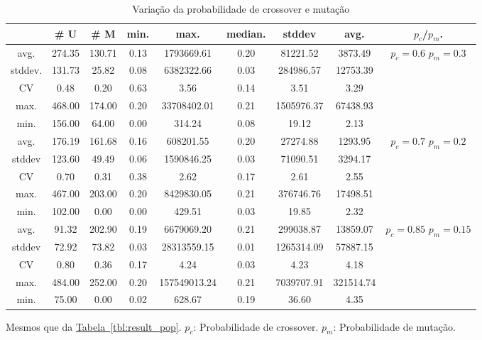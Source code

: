 \documentclass[a4paper]{article}
\begin{document}
\begin{table}
  \center
  \caption{Variação da probabilidade de crossover e mutação}
  \label{tbl:var_cross_mut}
  \begin{tabular}{| c | c | c | c | c | c | c | c | c |}
    \hline
    &  \# U & \# M & min. & max. & median. & stddev & avg. & $p_c$/$p_m$. \\ \hline
    avg.    & 274.35 & 130.71 & 0.13 & 1793669.61 & 0.20 & 81221.52 & 3873.49 &  \\ 
    stddev. & 131.73 & 25.82 & 0.08 & 6382322.66 & 0.03 & 284986.57 & 12753.39 & \\ 
    CV      & 0.48 & 0.20 & 0.63 & 3.56 & 0.14 & 3.51 & 3.29 & \\ 
    max.    & 468.00 & 174.00 & 0.20 & 33708402.01 & 0.21 & 1505976.37 & 67438.93 & \\ 
    min.    & 156.00 & 64.00 & 0.00 & 314.24 & 0.08 & 19.12 & 2.13 & \\ \hline \hline
    avg.    & 176.19 & 161.68 & 0.16 & 608201.55 & 0.20 & 27274.88 & 1293.95 &  \\ 
    stddev  & 123.60 & 49.49 & 0.06 & 1590846.25 & 0.03 & 71090.51 & 3294.17 & \\ 
    CV      & 0.70 & 0.31 & 0.38 & 2.62 & 0.17 & 2.61 & 2.55 & \\ 
    max.    & 467.00 & 203.00 & 0.20 & 8429830.05 & 0.21 & 376746.76 & 17498.51 & \\ 
    min.    & 102.00 & 0.00 & 0.00 & 429.51 & 0.03 & 19.85 & 2.32 & \\ \hline \hline
    avg.    & 91.32 & 202.90 & 0.19 & 6679069.20 & 0.21 & 299038.87 & 13859.07 &  \\ 
    stddev  & 72.92 & 73.82 & 0.03 & 28313559.15 & 0.01 & 1265314.09 & 57887.15 & \\ 
    CV      & 0.80 & 0.36 & 0.17 & 4.24 & 0.03 & 4.23 & 4.18 & \\ 
    max.    & 484.00 & 252.00 & 0.20 & 157549013.24 & 0.21 & 7039707.91 & 321514.74 & \\ 
    min.    & 75.00 & 0.00 & 0.02 & 628.67 & 0.19 & 36.60 & 4.35 & \\ \hline
  \end{tabular}
    \begin{minipage}{0.9\textwidth}
    {\center \footnotesize
      Mesmos que da \hyperref[tbl:result_pop]{Tabela~\ref*{tbl:result_pop}}.
      $p_c$: Probabilidade de crossover. $p_m$: Probabilidade de mutação.
    }
  \end{minipage}
\end{table}
\end{document}
